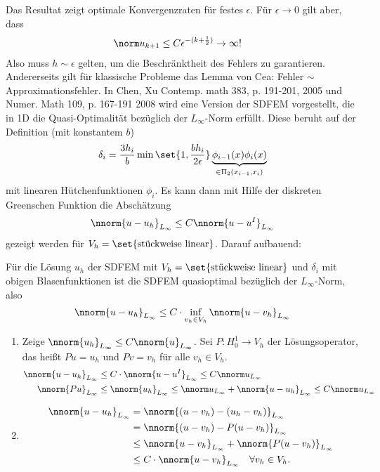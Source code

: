 Das Resultat zeigt optimale Konvergenzraten für festes $\epsilon$. Für $\epsilon \to 0$ gilt aber, dass
\begin{align*}
  \norm u_{k+1} &\leq C \epsilon^{- (k+ \frac 12)} \to \infty!
\end{align*}
Also muss $h \sim \epsilon$ gelten, um die Beschränktheit des Fehlers zu garantieren. Andererseits gilt für klassische Probleme das Lemma von Cea: Fehler $\sim$ Approximationsfehler. 
In Chen, Xu Contemp. math 383, p. 191-201, 2005 und Numer. Math 109, p. 167-191 2008 wird eine Version der SDFEM vorgestellt, die in 1D die Quasi-Optimalität bezüglich der $L_{\infty}$-Norm erfüllt. Diese beruht auf der Definition (mit konstantem $b$)
\begin{align*}
  \delta_{i} = \frac {3h_{i}} b \min \set{1, \frac{bh_{i}}{2\epsilon}}\underbrace{\phi_{i-1}(x) \phi_{i}(x)}_{\in \Pi_{2}(x_{i-1}, x_{i})}
\end{align*}
mit linearen Hütchenfunktionen $\phi_{i}$. Es kann dann mit Hilfe der diskreten Greenschen Funktion die Abschätzung
\begin{align*}
  \nnorm{u-u_{h}}_{L_{\infty}} \leq C  \nnorm{u-u^{I}}_{L_{\infty}} 
\end{align*}
gezeigt werden für $V_{h} = \set{\text{stückweise linear}}$. 
Darauf aufbauend:
\begin{satz}\label{thm:6-8}
  Für die Lösung $u_{h}$ der SDFEM mit $V_{h} = \set{\text{stückweise linear}}$ und $\delta_{i}$ mit obigen Blasenfunktionen ist die SDFEM quasioptimal bezüglich der $L_{\infty}$-Norm, also
  \begin{align*}
    \nnorm{u-u_{h}}_{L_{\infty}} \leq C\cdot \inf_{v_{h} \in V_{h}} \nnorm{u - v_{h}}_{L_{\infty}}
  \end{align*}
\end{satz}
\begin{beweis}
  \begin{enumerate}
  \item Zeige $\nnorm {u_{h}}_{L_{\infty}} \leq C \nnorm {u}_{L_{\infty}}$. 
Sei $P: H_{0}^{1} \to V_{h}$ der Lösungsoperator, das heißt $Pu= u_{h}$ und $Pv= v_{h}$ für alle $v_{h} \in V_{h}$. 
\begin{align*}
      \nnorm{u-u_{h}}_{L_{\infty}} &\leq C\cdot  \nnorm{u - u^{I}}_{L_{\infty}} \leq C \nnorm u _{L_{\infty}}\\
      \nnorm{Pu}_{L_{\infty}} &\leq \nnorm{u_{h}}_{L_{\infty}} \leq \nnorm u_{L_{\infty}}  + \nnorm{u - u_{h}}_{L_{\infty}} \leq C \nnorm u _{L_{\infty}}\\
\end{align*}
\item
  \begin{align*}
    \nnorm{u-u_{h}}_{L_{\infty}} &= \nnorm{(u - v_{h}) - (u_{h} - v_{h})}_{L_{\infty}}\\
&= \nnorm{(u - v_{h}) - P(u - v_{h})}_{L_{\infty}}\\
&\leq \nnorm{u - v_{h}}_{L_{\infty}} + \nnorm{P(u - v_{h})}_{L_{\infty}}\\
&\leq C \cdot\nnorm{u - v_{h}}_{L_{\infty}} \quad \forall v_{h} \in V_{h}. 
  \end{align*}
  \end{enumerate}
\end{beweis}

